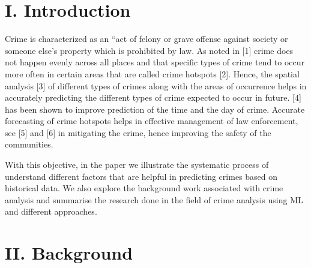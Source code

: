\documentclass[11 pt,conference,final,]{IEEEtran}
\begin{document}
\maketitle


%
\IEEEpeerreviewmaketitle


\section{I. Introduction}\label{i.-introduction}

Crime is characterized as an ``act of felony or grave offense against
society or someone else's property which is prohibited by law. As noted
in {[}1{]} crime does not happen evenly across all places and that
specific types of crime tend to occur more often in certain areas that
are called crime hotspots {[}2{]}. Hence, the spatial analysis {[}3{]}
of different types of crimes along with the areas of occurrence helps in
accurately predicting the different types of crime expected to occur in
future. {[}4{]} has been shown to improve prediction of the time and the
day of crime. Accurate forecasting of crime hotspots helps in effective
management of law enforcement, see {[}5{]} and {[}6{]} in mitigating the
crime, hence improving the safety of the communities.

With this objective, in the paper we illustrate the systematic process
of understand different factors that are helpful in predicting crimes
based on historical data. We also explore the background work associated
with crime analysis and summarise the research done in the field of
crime analysis using ML and different approaches.

\section{II. Background}\label{ii.-background}
\end{document}
